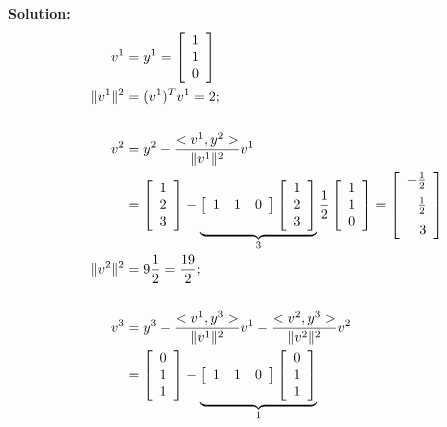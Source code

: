 \textbf{Solution:}
	\begin{align*}
		v^1 &= y^1 = \left[ \begin{array}{c} 1 \\ 1 \\ 0 \end{array} \right]\\
		\quad \| v^1 \|^2 &= (v^1)^T v^1 = 2 ;\\
		\\
		v^2	&= y^2 - \frac{<v^1,y^2>}{\| v^1 \|^2} v^1 \\
		&= \left[ \begin{array}{c} 1 \\ 2 \\ 3 \end{array} \right]
		- \underbrace{%
		   \left[ \begin{array}{ccc} 1 & 1 & 0 \end{array} \right]
		   \left[ \begin{array}{c} 1 \\ 2 \\ 3 \end{array} \right]%
		   }_{3}
		\frac{1}{2}
		   \left[ \begin{array}{c} 1 \\ 1 \\ 0 \end{array} \right]
		= \left[ \begin{array}{r}
			- \frac{1}{2} \medskip \\ \frac{1}{2} \medskip \\ 3
			\end{array} \right] \\
		\| v^2 \|^2 &= 9 \frac{1}{2} = \frac{19}{2} ;\\
		\\
		v^3	&= y^3 - \frac{<v^1,y^3>}{\| v^1 \|^2} v^1
			- \frac{<v^2,y^3>}{\| v^2 \|^2} v^2 \\
		&= \left[ \begin{array}{c} 0 \\ 1 \\ 1 \end{array} \right]
		- \underbrace{%
		   \left[ \begin{array}{ccc} 1 & 1 & 0 \end{array} \right]
		   \left[ \begin{array}{c} 0 \\ 1 \\ 1 \end{array} \right]%
		   }_{1}

\end{align*}
